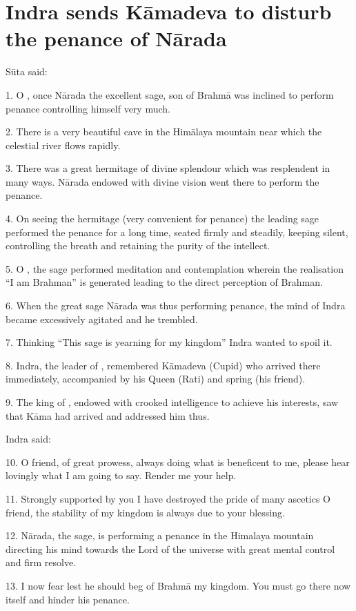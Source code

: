 \chapter{Indra sends Kāmadeva to disturb the penance of Nārada}

Sūta said:

1. O , once Nārada the excellent sage, son of Brahmā was inclined
to perform penance controlling himself very much.

2. There is a very beautiful cave in the Himālaya mountain near which
the celestial river flows rapidly.

3. There was a great hermitage of divine splendour which was resplendent in
many ways. Nārada endowed with divine vision went there to perform the penance.

4. On seeing the hermitage (very convenient for penance) the leading sage
performed the penance for a long time, seated firmly and steadily, keeping
silent, controlling the breath and retaining the purity of the intellect.

5. O , the sage performed meditation and contemplation wherein
the realisation “I am Brahman” is generated leading to the direct perception
of Brahman.

6. When the great sage Nārada was thus performing penance, the mind of Indra
became excessively agitated and he trembled.

7. Thinking “This sage is yearning for my kingdom” Indra wanted to spoil it.

8. Indra, the leader of , remembered Kāmadeva (Cupid) who arrived
there immediately, accompanied by his Queen (Rati) and spring (his friend).

9. The king of , endowed with crooked intelligence to achieve his
interests, saw that Kāma had arrived and addressed him thus.

Indra said:

10. O friend, of great prowess, always doing what is beneficent to me, please
hear lovingly what I am going to say. Render me your help.

11. Strongly supported by you I have destroyed the pride of many ascetics
O friend, the stability of my kingdom is always due to your blessing.

12. Nārada, the sage, is performing a penance in the Himalaya mountain directing
his mind towards the Lord of the universe with great mental control and firm
resolve.

13. I now fear lest he should beg of Brahmā my kingdom. You must go there now
itself and hinder his penance.

